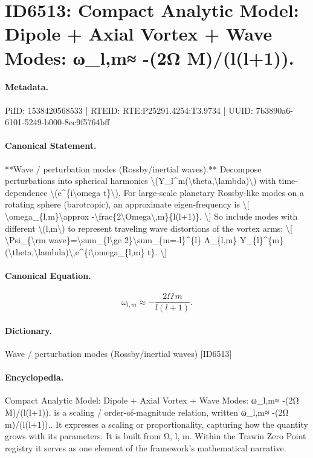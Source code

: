 \section*{ID6513: Compact Analytic Model: Dipole + Axial Vortex + Wave Modes: ω\_l,m≈ -(2Ω M)/(l(l+1)).}
\paragraph{Metadata.}
PiID: 1538420568533 | RTEID: RTE:P25291.4254:T3.9734 | UUID: 7b3890a6-6101-5249-b000-8ec9f5764bff

\paragraph{Canonical Statement.}
**Wave / perturbation modes (Rossby/inertial waves).** Decompose perturbations into spherical harmonics \textbackslash{}(Y\_l\textasciicircum{}m(\textbackslash{}theta,\textbackslash{}lambda)\textbackslash{}) with time-dependence \textbackslash{}(e\textasciicircum{}\{i\textbackslash{}omega t\}\textbackslash{}). For large-scale planetary Rossby-like modes on a rotating sphere (barotropic), an approximate eigen-frequency is \textbackslash{}[ \textbackslash{}omega\_\{l,m\}\textbackslash{}approx -\textbackslash{}frac\{2\textbackslash{}Omega\textbackslash{},m\}\{l(l+1)\}. \textbackslash{}] So include modes with different \textbackslash{}(l,m\textbackslash{}) to represent traveling wave distortions of the vortex arms: \textbackslash{}[ \textbackslash{}Psi\_\{\textbackslash{}rm wave\}=\textbackslash{}sum\_\{l\textbackslash{}ge 2\}\textbackslash{}sum\_\{m=-l\}\textasciicircum{}\{l\} A\_\{l,m\} Y\_\{l\}\textasciicircum{}\{m\}(\textbackslash{}theta,\textbackslash{}lambda)\textbackslash{},e\textasciicircum{}\{i\textbackslash{}omega\_\{l,m\} t\}. \textbackslash{}]

\paragraph{Canonical Equation.}
\[
\omega_{l,m}\approx -\frac{2\Omega\,m}{l(l+1)}.
\]

\paragraph{Dictionary.}
Wave / perturbation modes (Rossby/inertial waves) [ID6513]

\paragraph{Encyclopedia.}
Compact Analytic Model: Dipole + Axial Vortex + Wave Modes: ω\_l,m≈ -(2Ω M)/(l(l+1)). is a scaling / order-of-magnitude relation, written ω\_l,m≈ -(2Ω m)/(l(l+1)).. It expresses a scaling or proportionality, capturing how the quantity grows with its parameters. It is built from Ω, l, m. Within the Trawin Zero Point registry it serves as one element of the framework's mathematical narrative.
